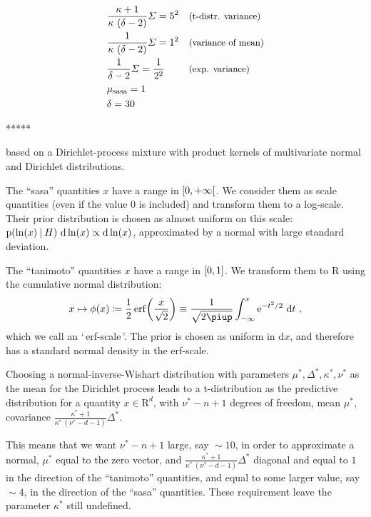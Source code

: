 \documentclass[\ifafour a4paper,12pt,\else a5paper,10pt,\fi%
onecolumn,oneside,article,%
british%
]{memoir}
\newcommand*{\defquote}[1]{`\,#1\,'}
\theoremstyle{remark}
\theoremstyle{innote}
\newcommand*{\pu}{\piup}%
\newcommand*{\e}{\mathrm{e}}%
\newcommand*{\di}{\mathrm{d}}%
\newcommand*{\RR}{\bm{\mathrm{R}}}
\newcommand*{\defd}{\coloneqq}
\DeclarePairedDelimiter\clcl{[}{]}
\DeclarePairedDelimiter\clop{[}{[}
\newcommand*{\p}{\mathrm{p}}%
\renewcommand*{\|}[1][]{\nonscript\:#1\vert\nonscript\:\mathopen{}}
\renewcommand*{\=}{\TextOrMath\texteq\eq}
\begin{document}
\begin{equation}
  \label{eq:requirements_hyperparams}
  \begin{aligned}
   &\frac{\kappa+1}{\kappa\ (\delta-2)}\varSigma = 5^{2}
&&\text{\small(t-distr. variance)}
    \\
    &\frac{1}{\kappa\ (\delta-2)}\varSigma = 1^{2}
&&\text{\small(variance of mean)}
    \\
    &\frac{1}{\delta-2}\varSigma = \frac{1}{2^{2}}
&&\text{\small(exp. variance)}
    \\
    &\mu_{\text{sasa}} = 1 &&
    \\
    &\delta = 30 &&
  \end{aligned}
\end{equation}

*****



based on a Dirichlet-process mixture with
product kernels of multivariate normal and Dirichlet distributions.



The \enquote{sasa} quantities $x$ have a range in $\clop{0,+\infty}$. We
consider them as scale quantities (even if the value $0$ is included) and
transform them to a log-scale. Their prior distribution is chosen as
almost uniform on this scale:
$\p(\ln(x) \| H)\ \di\ln(x) \propto \di\ln(x)$, approximated by a normal
with large standard deviation.

The \enquote{tanimoto} quantities $x$ have a range in $\clcl{0,1}$. We
transform them to $\RR$ using the cumulative normal distribution:
\begin{equation}
  \label{eq:transf_tanimoto}
  x \mapsto \phi(x) \defd
  \frac{1}{2}\operatorname{erf}\biggl(\frac{x}{\sqrt{2}}\biggr)
  \equiv \frac{1}{\sqrt{2\pu}}\int_{-\infty}^{x} \e^{-t^{2}/2}\ \di t \ ,
\end{equation}
which we call an \defquote{erf-scale}.
The prior is chosen as uniform in $\di x$, and therefore has a standard
normal density in the erf-scale.

Choosing a normal-inverse-Wishart distribution with parameters
$\mu^{*}, \varDelta^{*}, \kappa^{*}, \nu^{*}$ as the mean for the Dirichlet
process leads to a t-distribution as the predictive distribution for a
quantity $x \in \RR^{d}$, with $\nu^{*}-n+1$ degrees of freedom, mean
$\mu^{*}$, covariance
$\frac{\kappa^{*}+1}{\kappa^{*}\ (\nu^{*}-d-1)}\varDelta^{*}$.

This means that we want $\nu^{*}-n+1$ large, say ${}\sim 10$, in order to
approximate a normal, $\mu^{*}$ equal to the zero vector, and
$\frac{\kappa^{*}+1}{\kappa^{*}\ (\nu^{*}-d-1)}\varDelta^{*}$ diagonal and
equal to $1$ in the direction of the \enquote{tanimoto} quantities, and
equal to some larger value, say ${}\sim 4$, in the direction of the \enquote{sasa}
quantities. These requirement leave the parameter $\kappa^{*}$ still undefined.
\end{document}
